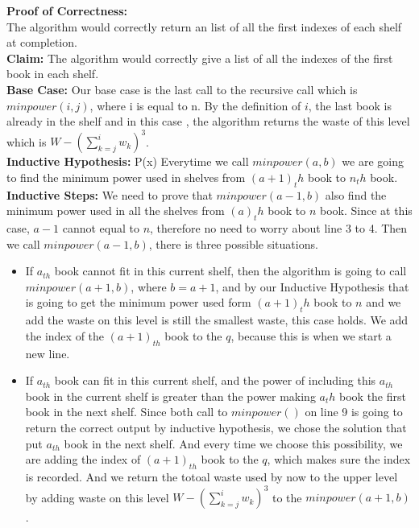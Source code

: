 \documentclass[14pt]{article}
\begin{document}
\begin{enumerate}
    \textbf{Proof of Correctness:}\\
    The algorithm would correctly return an list of all the first indexes of each
    shelf at completion.\\
    \textbf{Claim:} The algorithm would correctly give a list of all the indexes
    of the first book in each shelf.\\
    \textbf{Base Case:} Our base case is the last call to the recursive call which
    is $minpower(i,j)$, where i is equal to n. By the definition of $i$, the last
    book is already in the shelf and in this case , the algorithm returns the waste
    of this level which is $W-(\sum_{k = j}^i w_k)^3$.\\
    \textbf{Inductive Hypothesis:} P(x) Everytime we call $minpower(a,b)$ we are going 
    to find the minimum power used in shelves from $(a+1)_th$ book to $n_th$ book.\\
    \textbf{Inductive Steps:} We need to prove that $minpower(a-1,b)$ also find 
    the minimum power used in all the shelves from $(a)_th$ book to $n$ book. 
    Since at this case, $a-1$ cannot equal to $n$, therefore no need to worry about
    line 3 to 4. Then we call $minpower(a-1,b)$, there is three possible situations.
    \begin{itemize}
        \item If $a_{th}$ book cannot fit in this current shelf, then the algorithm
        is going to call $minpower(a+1, b)$, where $b = a+1$, and by our Inductive
        Hypothesis that is going to get the minimum power used form $(a+1)_th$ 
        book to $n$ and we add the waste on this level is still the smallest waste,
        this case holds. We add the index of the $(a+1)_{th}$ book to the $q$, 
        because this is when we start a new line.
        \item If $a_{th}$ book can fit in this current shelf, and the power of 
        including this $a_{th}$ book in the current shelf is greater than the power
        making $a_th$ book the first book in the next shelf. Since both call to 
        $minpower()$ on line 9 is going to return the correct output by inductive
        hypothesis, we chose the solution that put $a_{th}$ book in the 
        next shelf. And every time we choose this possibility, we are adding the 
        index of $(a+1)_{th}$ book to the $q$, which makes sure the index is recorded.
        And we return the totoal waste used by now to the upper level by adding waste
        on this level $W-(\sum_{k = j}^i w_k)^3$ to the $minpower(a+1, b)$.

\end{itemize}
\end{enumerate}
\end{document}
